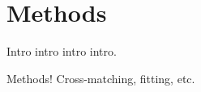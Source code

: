 \chapter{Methods}
\begin{chapabstract}

Intro intro intro intro.

\end{chapabstract}

Methods!
Cross-matching, fitting, etc.

